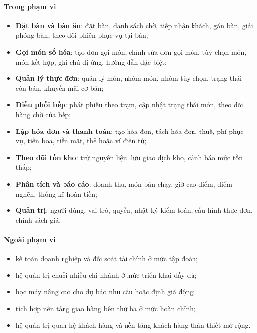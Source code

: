 \documentclass[11pt,a4paper]{article}
\begin{document}
\paragraph{Trong phạm vi}
\begin{itemize}
    \item \textbf{Đặt bàn và bàn ăn}: đặt bàn, danh sách chờ, tiếp nhận khách, gán bàn, giải phóng bàn, theo dõi phiên phục vụ tại bàn;
    \item \textbf{Gọi món số hóa}: tạo đơn gọi món, chỉnh sửa đơn gọi món, tùy chọn món, món kết hợp, ghi chú dị ứng, hướng dẫn đặc biệt;
    \item \textbf{Quản lý thực đơn}: quản lý món, nhóm món, nhóm tùy chọn, trạng thái còn bán, khuyến mãi cơ bản;
    \item \textbf{Điều phối bếp}: phát phiếu theo trạm, cập nhật trạng thái món, theo dõi hàng chờ của bếp;
    \item \textbf{Lập hóa đơn và thanh toán}: tạo hóa đơn, tách hóa đơn, thuế, phí phục vụ, tiền boa, tiền mặt, thẻ hoặc ví điện tử;
    \item \textbf{Theo dõi tồn kho}: trừ nguyên liệu, lưu giao dịch kho, cảnh báo mức tồn thấp;
    \item \textbf{Phân tích và báo cáo}: doanh thu, món bán chạy, giờ cao điểm, điểm nghẽn, thống kê hoàn tiền;
    \item \textbf{Quản trị}: người dùng, vai trò, quyền, nhật ký kiểm toán, cấu hình thực đơn, chính sách giá.
\end{itemize}

\paragraph{Ngoài phạm vi}
\begin{itemize}
    \item kế toán doanh nghiệp và đối soát tài chính ở mức tập đoàn;
    \item hệ quản trị chuỗi nhiều chi nhánh ở mức triển khai đầy đủ;
    \item học máy nâng cao cho dự báo nhu cầu hoặc định giá động;
    \item tích hợp nền tảng giao hàng bên thứ ba ở mức hoàn chỉnh;
    \item hệ quản trị quan hệ khách hàng và nền tảng khách hàng thân thiết mở rộng.
\end{itemize}
\end{document}
